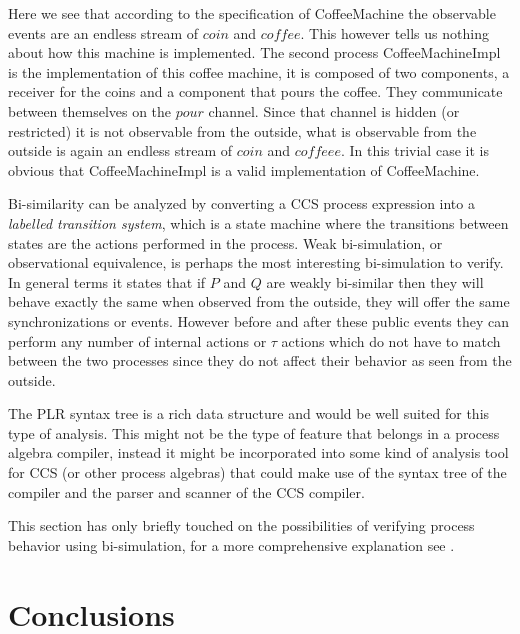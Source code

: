 	Here we see that according to the specification of \textsf{CoffeeMachine} 
	the observable events are an endless stream of $coin$ and $coffee$. This 
	however tells us nothing about how this machine is implemented. The second 
	process \textsf{CoffeeMachineImpl} is the implementation of this coffee 
	machine, it is composed of two components, a receiver for the coins and a 
	component that pours the coffee. They communicate between themselves on the 
	$pour$ channel. Since that channel is hidden (or restricted) it is not 
	observable from the outside, what is observable from the outside is again an 
	endless stream of $coin$ and $coffeee$. In this trivial case it is obvious 
	that \textsf{CoffeeMachineImpl} is a valid implementation of 
	\textsf{CoffeeMachine}.
	
	Bi-similarity can be analyzed by converting a CCS process expression into a 
	\textit{labelled transition system}, which is a state machine where the 
	transitions between states are the actions performed in the process. Weak 
	bi-simulation, or observational equivalence, is perhaps the most interesting 
	bi-simulation to verify. In general terms it states that if $P$ and $Q$ are 
	weakly bi-similar then they will behave exactly the same when observed from 
	the outside, they will offer the same synchronizations or events. However 
	before and after these public events they can perform any number of internal 
	actions or $\tau$ actions which do not have to match between the two 
	processes since they do not affect their behavior as seen from the outside. 
	
	The PLR syntax tree is a rich data structure and would be well suited for 
	this type of analysis. This might not be the type of feature that belongs in 
	a process algebra compiler, instead it might be incorporated into some kind 
	of analysis tool for CCS (or other process algebras) that could make use of 
	the syntax tree of the compiler and the parser and scanner of the CCS 
	compiler. 
	
	This section has only briefly touched on the possibilities of verifying 
	process behavior using bi-simulation, for a more comprehensive explanation 
	see \cite{reactive}.
	
\section{Conclusions}

